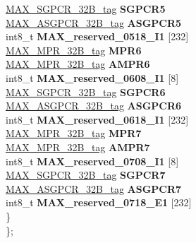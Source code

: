 \begin{DoxyCompactItemize}
\begin{tabbing}
\>\>\mbox{\hyperlink{unionMAX__SGPCR__32B__tag}{MAX\_SGPCR\_32B\_tag}} {\bfseries SGPCR5}\\
\>\>\mbox{\hyperlink{unionMAX__ASGPCR__32B__tag}{MAX\_ASGPCR\_32B\_tag}} {\bfseries ASGPCR5}\\
\>\>int8\_t {\bfseries MAX\_reserved\_0518\_I1} \mbox{[}232\mbox{]}\\
\>\>\mbox{\hyperlink{unionMAX__MPR__32B__tag}{MAX\_MPR\_32B\_tag}} {\bfseries MPR6}\\
\>\>\mbox{\hyperlink{unionMAX__MPR__32B__tag}{MAX\_MPR\_32B\_tag}} {\bfseries AMPR6}\\
\>\>int8\_t {\bfseries MAX\_reserved\_0608\_I1} \mbox{[}8\mbox{]}\\
\>\>\mbox{\hyperlink{unionMAX__SGPCR__32B__tag}{MAX\_SGPCR\_32B\_tag}} {\bfseries SGPCR6}\\
\>\>\mbox{\hyperlink{unionMAX__ASGPCR__32B__tag}{MAX\_ASGPCR\_32B\_tag}} {\bfseries ASGPCR6}\\
\>\>int8\_t {\bfseries MAX\_reserved\_0618\_I1} \mbox{[}232\mbox{]}\\
\>\>\mbox{\hyperlink{unionMAX__MPR__32B__tag}{MAX\_MPR\_32B\_tag}} {\bfseries MPR7}\\
\>\>\mbox{\hyperlink{unionMAX__MPR__32B__tag}{MAX\_MPR\_32B\_tag}} {\bfseries AMPR7}\\
\>\>int8\_t {\bfseries MAX\_reserved\_0708\_I1} \mbox{[}8\mbox{]}\\
\>\>\mbox{\hyperlink{unionMAX__SGPCR__32B__tag}{MAX\_SGPCR\_32B\_tag}} {\bfseries SGPCR7}\\
\>\>\mbox{\hyperlink{unionMAX__ASGPCR__32B__tag}{MAX\_ASGPCR\_32B\_tag}} {\bfseries ASGPCR7}\\
\>\>int8\_t {\bfseries MAX\_reserved\_0718\_E1} \mbox{[}232\mbox{]}\\
\>\} \\
\}; \\


\end{tabbing}
\end{DoxyCompactItemize}
